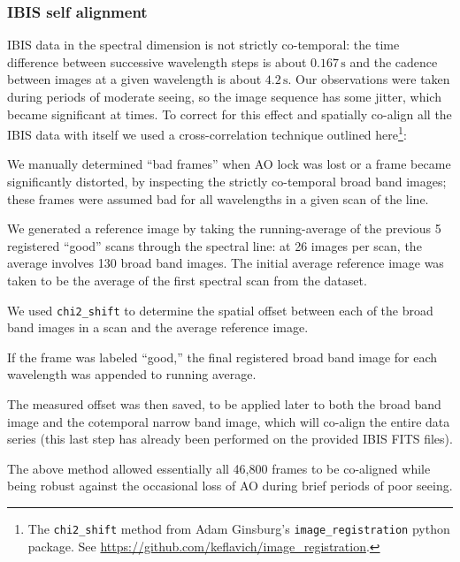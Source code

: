 \documentclass[twocolumn]{aastex62}
\newcommand{\unit}[1]{\ensuremath{\, \mathrm{#1}}}
\begin{document}
\subsubsection{IBIS self alignment}\label{sec:ibisselfalign}
IBIS data in the spectral dimension is not strictly co-temporal: the time difference between successive wavelength steps is about $0.167\unit{s}$ and the cadence between images at a given wavelength is about $4.2\unit{s}$.
Our observations were taken during periods of moderate seeing, so the image sequence has some jitter, which became significant at times.  
To correct for this effect and spatially co-align all the IBIS data with itself we used a cross-correlation technique outlined here\footnote{The \texttt{chi2\_shift} method from Adam Ginsburg's \texttt{image\_registration} python package.  See \url{https://github.com/keflavich/image_registration}.}: 
\begin{enumerate}
    {\item We manually determined ``bad frames'' when AO lock was lost or a frame became significantly distorted, by inspecting the strictly co-temporal broad band images; these frames were assumed bad for all wavelengths in a given scan of the line.}
    {\item We generated a reference image by taking the running-average of the previous 5 registered ``good'' scans through the spectral line: at 26 images per scan, the average involves 130 broad band images.
    The initial average reference image was taken to be the average of the first spectral scan from the dataset.}
    {\item We used \texttt{chi2\_shift} to determine the spatial offset between each of the broad band images in a scan and the average reference image.}
    {\item If the frame was labeled ``good,'' the final registered broad band image for each wavelength was appended to running average.}
    {\item The measured offset was then saved, to be applied later to both the broad band image and the cotemporal narrow band image, which will co-align the entire data series (this last step has already been performed on the provided IBIS FITS files).}
\end{enumerate}

The above method allowed essentially all 46,800 frames to be co-aligned while being robust against the occasional loss of AO during brief periods of poor seeing.\par
\end{document}
